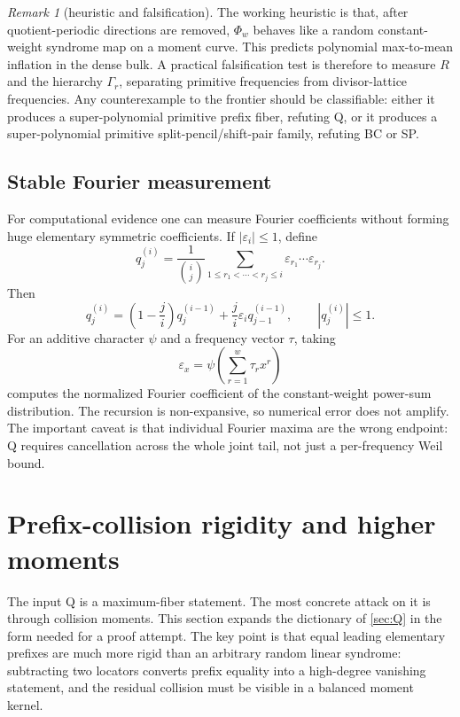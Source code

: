 \documentclass[11pt]{article}
\theoremstyle{definition}
\theoremstyle{remark}
\newtheorem{remark}[theorem]{Remark}
\begin{document}
\begin{remark}[heuristic and falsification]
The working heuristic is that, after quotient-periodic directions are removed, \(\Phi_w\) behaves like a random constant-weight syndrome map on a moment curve.  This predicts polynomial max-to-mean inflation in the dense bulk.  A practical falsification test is therefore to measure \(R\) and the hierarchy \(\Gamma_r\), separating primitive frequencies from divisor-lattice frequencies.  Any counterexample to the frontier should be classifiable: either it produces a super-polynomial primitive prefix fiber, refuting Q, or it produces a super-polynomial primitive split-pencil/shift-pair family, refuting BC or SP.
\end{remark}

\subsection{Stable Fourier measurement}

For computational evidence one can measure Fourier coefficients without forming huge elementary symmetric coefficients.  If \(|\varepsilon_i|\le1\), define
\[
        q_j^{(i)}=\frac{1}{\binom ij}\sum_{1\le r_1<\cdots<r_j\le i}\varepsilon_{r_1}\cdots\varepsilon_{r_j}.
\]
Then
\[
        q_j^{(i)}=\left(1-\frac{j}{i}\right)q_j^{(i-1)}+\frac{j}{i}\varepsilon_i q_{j-1}^{(i-1)},
        \qquad |q_j^{(i)}|\le1.
\]
For an additive character \(\psi\) and a frequency vector \(\tau\), taking
\[
        \varepsilon_x=\psi\left(\sum_{r=1}^w\tau_rx^r\right)
\]
computes the normalized Fourier coefficient of the constant-weight power-sum distribution.  The recursion is non-expansive, so numerical error does not amplify.  The important caveat is that individual Fourier maxima are the wrong endpoint: Q requires cancellation across the whole joint tail, not just a per-frequency Weil bound.

\section{Prefix-collision rigidity and higher moments}\label{sec:prefix-collision-rigidity}

The input Q is a maximum-fiber statement.  The most concrete attack on it is through collision moments.  This section expands the dictionary of \cref{sec:Q} in the form needed for a proof attempt.  The key point is that equal leading elementary prefixes are much more rigid than an arbitrary random linear syndrome: subtracting two locators converts prefix equality into a high-degree vanishing statement, and the residual collision must be visible in a balanced moment kernel.
\end{document}
